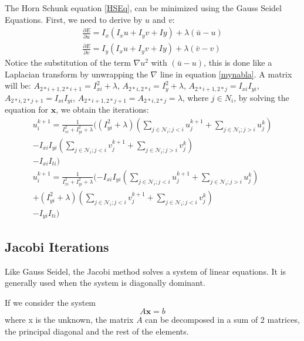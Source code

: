 \documentclass[12pt,a4paper,twoside]{report}
\begin{document}
{The Horn Schunk equation \ref{HSEq}, can be minimized using the Gauss Seidel Equations.
First, we need to derive by $u$  and $v$:
\begin{equation} \label{partialDer}
\begin{split} 
\frac{\partial E}{\partial u} = I_x(I_xu+I_yv+Iy) + \lambda(\bar{u}-u) \\
\frac{\partial E}{\partial v} = I_y(I_xu+I_yv+Iy) + \lambda(\bar{v}-v)
\end{split}
\end{equation}
Notice the substitution of the term $\nabla u ^2$ with $(\bar{u}-u)$, this is done like a Laplacian transform by unwrapping the $\nabla$ line in equation \ref{mynabla}.
 A matrix will be: 
$A_{2*i+1, 2*i+1} = I^2_{xi}+ \lambda$,
 $A_{2*i, 2*i} = I^2_{y}+ \lambda$,
$A_{2*i+1, 2*j} = I_{xi}I_{yi}$,  
$A_{2*i, 2*j+1} = I_{xi}I_{yi}$, 
 $A_{2*i+1, 2*j+1} = A_{2*i, 2*j} = \lambda$, where $j \in N_i $, by solving the equation for $\boldsymbol{x}$, we obtain the iterations:
 \begin{equation} \label{GSEq}
 \begin{split}
 u^{k+1}_i = \frac{1}{I_{xi}^2+I_{yi}^2+ \lambda}
					 (
					 (I_{yi}^2+\lambda)(\sum_{j \in \mathcal{N}_i;j<i} u_j^{k+1} + \sum_{j \in \mathcal{N}_i;j>i} u_j^k) \\
					 -I_{xi}I_{yi}(\sum_{j \in \mathcal{N}_i;j<i} v_j^{k+1} + \sum_{j \in \mathcal{N}_i;j>i} v_j^k)\\
					 -I_{xi}I_{ti}
					)
					 \\
   u^{k+1}_i = \frac{1}{I_{xi}^2+I_{yi}^2+ \lambda}
			   (
			   -I_{xi}I_{yi}(\sum_{j \in \mathcal{N}_i;j<i} u_j^{k+1} + \sum_{j \in \mathcal{N}_i;j>i} u_j^k)\\
			   +(I_{yi}^2+\lambda)(\sum_{j \in \mathcal{N}_i;j<i} v_j^{k+1} + \sum_{j \in \mathcal{N}_i;j<i} v_j^k)\\
			   -I_{yi}I_{ti}
			   )
 \end{split}
 \end{equation}
\subsection{Jacobi Iterations}
Like Gauss Seidel, the Jacobi method solves a system of linear equations\cite{golub2012matrix}. It is generally used when the system is diagonally dominant. 

If we consider the system 
\begin{equation}
	A\boldsymbol{x} = b
\end{equation}
where x is the unknown, the matrix $A$ can be decomposed in a sum of 2 matrices, the principal diagonal and the rest of the elements.

}
\end{document}

